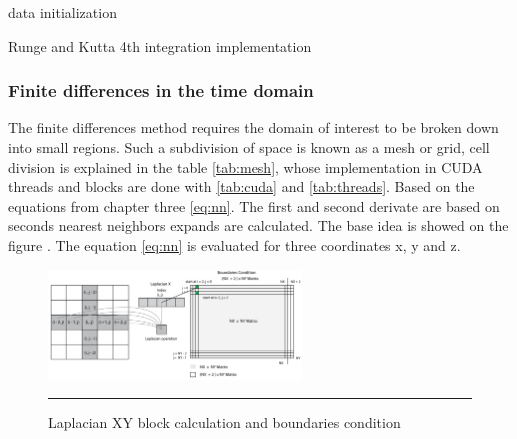 \begin{algorithm}[H]
 data initialization\;
 \label{log:rk4}
 \caption{Runge and Kutta 4th integration implementation}
\end{algorithm}

\subsubsection{Finite differences in the time domain}

The finite differences method requires the domain of interest to be broken down into small regions. Such a subdivision of space is known as a mesh or grid, cell division is explained in the table \ref{tab:mesh}, whose implementation in CUDA threads and blocks are done with \ref{tab:cuda} and \ref{tab:threads}. Based on the equations from chapter three \ref{eq:nn}. The first and second derivate are based on seconds nearest neighbors expands are calculated. The base idea is showed on the figure	 \label{fig:laplacian}. The equation \ref{eq:nn} is evaluated for three coordinates x, y and z.

\begin{figure}[htbp]
	\centering
		\includegraphics[width=0.6\textwidth]{Figures/laplacian.png}
		\rule{35em}{0.2pt}
	\caption[Laplacian block calculation]{Laplacian XY block calculation and boundaries condition}
	\label{fig:laplacian}
\end{figure}

